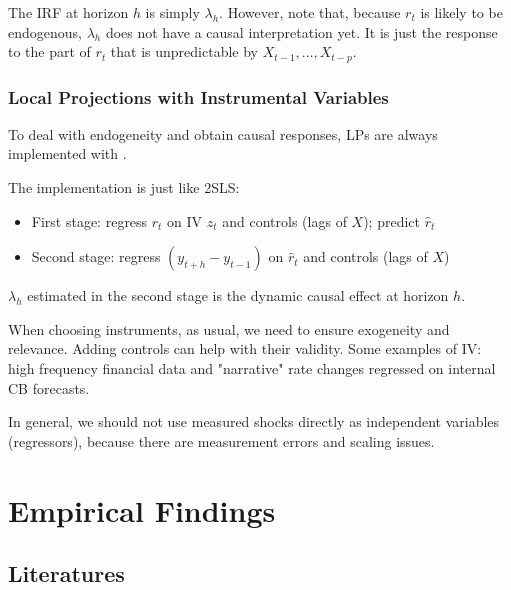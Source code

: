                 The IRF at horizon $h$ is simply $\lambda_h$. However, note that, because $r_t$ is likely to be endogenous, $\lambda_h$ does not have a causal interpretation yet. It is just the response to the part of $r_t$ that is unpredictable by $X_{t-1}, \dots, X_{t-p}$.

            \subsubsection{Local Projections with Instrumental Variables}
            
                To deal with endogeneity and obtain causal responses, LPs are always implemented with .

                The implementation is just like 2SLS:
                \begin{itemize}
                    \item First stage: regress $r_t$ on IV $z_t$ and controls (lags of $X$); predict $\hat{r}_t$
                    \item Second stage: regress $(y_{t+h}-y_{t-1})$ on $\hat{r}_t$ and controls (lags of $X$)
                \end{itemize}
                $\lambda_h$ estimated in the second stage is the dynamic causal effect at horizon $h$.

                When choosing instruments, as usual, we need to ensure exogeneity and relevance. Adding controls can help with their validity. Some examples of IV: high frequency financial data and "narrative" rate changes regressed on internal CB forecasts.

                In general, we should not use measured shocks directly as independent variables (regressors), because there are measurement errors and scaling issues.

    \section{Empirical Findings}

        \subsection{Literatures}

